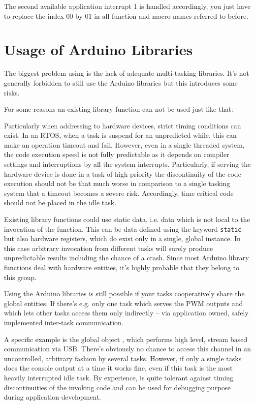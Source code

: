 The second available application interrupt 1 is handled accordingly, you
just have to replace the index 00 by 01 in all function and macro names
referred to before.


\section{Usage of Arduino Libraries}

The biggest problem using \rtos{} is the lack of adequate multi-tasking
libraries. It's not generally forbidden to still use the Arduino libraries
but this introduces some risks. 

For some reasons an existing library function can not be used just like
that:

Particularly when addressing to hardware devices, strict timing conditions
can exist. In an RTOS, when a task is suspend for an unpredicted while,
this can make an operation timeout and fail. However, even in a single
threaded system, the code execution speed is not fully predictable as it
depends on compiler settings and interruptions by all the system
interrupts. Particularly, if serving the hardware device is done in a task
of high priority the discontinuity of the code execution should not be
that much worse in comparison to a single tasking system that a timeout
becomes a severe risk. Accordingly, time critical code should not be
placed in the idle task.

Existing library functions could use static data, i.e. data which is not
local to the invocation of the function. This can be data defined using
the keyword \verb+static+ but also hardware registers, which do exist only
in a single, global instance. In this case arbitrary invocation from
different tasks will surely produce unpredictable results including the
chance of a crash. Since most Arduino library functions deal with hardware
entities, it's highly probable that they belong to this group.

Using the Arduino libraries is still possible if your tasks cooperatively
share the global entities. If there's e.g. only one task which serves the
PWM outputs and which lets other tasks access them only indirectly -- via
application owned, safely implemented inter-task communication.

A specific example is the global object , which performs
high level, stream based communication via USB. There's obviously no
chance to access this channel in an uncontrolled, arbitrary fashion by
several tasks. However, if only a single tasks does the console output at
a time it works fine, even if this task is the most heavily interrupted
idle task. By experience,  is quite tolerant against timing
discontinuities of the invoking code and can be used for debugging purpose
during application development.

